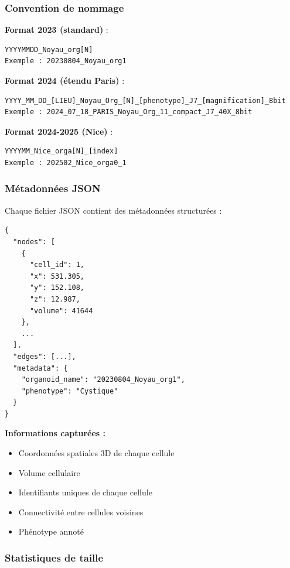 \subsubsection{Convention de nommage}

\textbf{Format 2023 (standard)} :
\begin{verbatim}
YYYYMMDD_Noyau_org[N]
Exemple : 20230804_Noyau_org1
\end{verbatim}

\textbf{Format 2024 (étendu Paris)} :
\begin{verbatim}
YYYY_MM_DD_[LIEU]_Noyau_Org_[N]_[phenotype]_J7_[magnification]_8bit
Exemple : 2024_07_18_PARIS_Noyau_Org_11_compact_J7_40X_8bit
\end{verbatim}

\textbf{Format 2024-2025 (Nice)} :
\begin{verbatim}
YYYYMM_Nice_orga[N]_[index]
Exemple : 202502_Nice_orga0_1
\end{verbatim}

\subsubsection{Métadonnées JSON}

Chaque fichier JSON contient des métadonnées structurées :

\begin{verbatim}
{
  "nodes": [
    {
      "cell_id": 1,
      "x": 531.305,
      "y": 152.108,
      "z": 12.987,
      "volume": 41644
    },
    ...
  ],
  "edges": [...],
  "metadata": {
    "organoid_name": "20230804_Noyau_org1",
    "phenotype": "Cystique"
  }
}
\end{verbatim}

\textbf{Informations capturées :}
\begin{itemize}
    \item Coordonnées spatiales 3D de chaque cellule
    \item Volume cellulaire
    \item Identifiants uniques de chaque cellule
    \item Connectivité entre cellules voisines
    \item Phénotype annoté
\end{itemize}

\subsubsection{Statistiques de taille}

